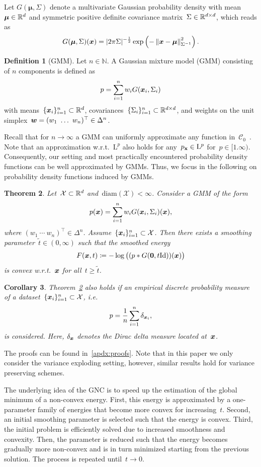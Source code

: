 \documentclass{article}
\newcommand{\N}{\mathbb{N}}
\newcommand{\C}{\mathcal{C}}
\renewcommand{\L}{\mathrm{L}}
\newcommand{\X}{\mathcal{X}}
\newcommand{\id}{\mathrm{Id}}
\newcommand{\norm}[1]{\left\Vert#1\right\Vert}
\renewcommand{\vec}[1]{\mathbf{#1}}
\newcommand{\diameter}{\mathrm{diam}}
\theoremstyle{plain}
\newtheorem{theorem}{Theorem}[section]
\newtheorem{corollary}[theorem]{Corollary}
\theoremstyle{definition}
\newtheorem{definition}[theorem]{Definition}
\theoremstyle{remark}
\begin{document}
Let $G(\bm{\mu},\Sigma)$ denote a multivariate Gaussian probability density with mean~$\bm{\mu}\in\mathbb{R}^d$ and symmetric positive definite covariance matrix~$\Sigma\in\mathbb{R}^{d\times d}$, which reads as
\[
G(\bm{\mu},\Sigma)(\vx)=\vert 2\pi\Sigma\vert^{-\frac{1}{2}}\exp\left(-\norm{\vx-\bm{\mu}}_{\Sigma^{-1}}^2\right).
\]
\begin{definition}[GMM]
Let $n\in\N$.
A Gaussian mixture model (GMM) consisting of $n$ components is defined as
\[
p = \sum_{i=1}^n w_i G({\bm{x}}_i,\Sigma_i)
\]
with means~$\{{\bm{x}}_i\}_{i=1}^n\subset\mathbb{R}^d$, covariances~$\{\Sigma_i\}_{i=1}^n\subset\mathbb{R}^{d\times d}$, and weights on the unit simplex~$\vw=(w_1\ \ldots\ w_n)^\top\in\Delta^n$.
\end{definition}
Recall that for $n\to\infty$ a GMM can uniformly approximate any function in~$\C_0$~\citep{NgNg20}.
Note that an approximation w.r.t.~$\L^p$ also holds for any~$p_\rvx\in\L^p$ for~$p\in[1.\infty)$.
Consequently, our setting and most practically encountered probability density functions can be well approximated by GMMs.
Thus, we focus in the following on probability density functions induced by GMMs.

\begin{theorem}\label{thm:Fconvex}
Let~$\X\subset\R^d$ and~$\diameter(\X)<\infty$. 
Consider a GMM of the form
\[
p({\bm{x}}) = \sum_{i=1}^n w_i G({\bm{x}}_i,\Sigma_i)({\bm{x}}),
\]
where $(w_1\ \cdots \ w_n)^\top\in\Delta^n$. Assume~$\{\vx_i\}_{i=1}^n\subset\X$.
Then there exists a smoothing parameter~$\widetilde{t}\in(0,\infty)$ such that the smoothed energy
\[
F(\vx,t)\coloneqq -\log \big( (p \ast G(\vec{0}, t\id))(\vx)\big)
\]
is \emph{convex} w.r.t.~${\bm{x}}$ for all~$t\geq\widetilde{t}$.
\end{theorem}
\begin{corollary}\label{cor:empirical}
Theorem~\ref{thm:Fconvex} also holds if an empirical discrete probability measure of a dataset~$\{\vx_i\}_{i=1}^n\subset\X$, i.e.
\[
p = \frac{1}{n}\sum_{i=1}^n\delta_{{\bm{x}}_i},
\]
is considered.
Here, $\delta_{{\bm{x}}}$ denotes the Dirac delta measure located at~${\bm{x}}$.
\end{corollary}
The proofs can be found in~\cref{apdx:proofs}.
Note that in this paper we only consider the variance exploding setting, however, similar results hold for variance preserving schemes. 

The underlying idea of the GNC is to speed up the estimation of the global minimum of a non-convex energy.
First, this energy is approximated by a one-parameter family of energies that become more convex for increasing~$t$.
Second, an initial smoothing parameter is selected such that the energy is convex.
Third, the initial problem is efficiently solved due to increased smoothness and convexity.
Then, the parameter is reduced such that the energy becomes gradually more non-convex and is in turn minimized starting from the previous solution.
The process is repeated until~$t\to0$.
\end{document}
